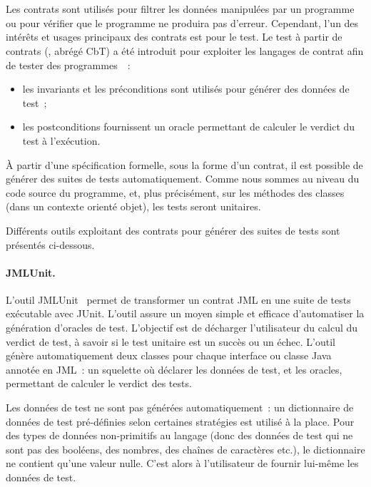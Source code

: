 \section{}
\label{section:sota:cbt}

Les contrats sont utilisés pour {\strong filtrer} les données manipulées par un
programme ou pour vérifier que le programme ne produira pas d'erreur. Cependant,
l'un des intérêts et usages principaux des contrats est pour le test. Le
{\strong test à partir de contrats} (, abrégé
CbT) a été introduit pour exploiter les langages de contrat afin de tester des
programmes~~:
%
\begin{itemize}

\item les invariants et les préconditions sont utilisés pour {\strong générer
des données} de test~;

\item les postconditions {\strong fournissent un oracle} permettant de calculer
le verdict du test à l'exécution.

\end{itemize}
%
À partir d'une spécification formelle, sous la forme d'un contrat, il est
possible de générer des suites de tests automatiquement. Comme nous sommes au
niveau du code source du programme, et, plus précisément, sur les méthodes des
classes (dans un contexte orienté objet), les tests seront {\strong unitaires}.

Différents outils exploitant des contrats pour générer des suites de tests sont
présentés ci-dessous.

\paragraph{JMLUnit.} L'outil JMLUnit~ permet de
transformer un contrat JML en une suite de tests exécutable avec JUnit. L'outil
assure un moyen simple et efficace d'automatiser la génération d'oracles de
test. L'objectif est de décharger l'utilisateur du calcul du verdict de test, à
savoir si le test unitaire est un succès ou un échec. L'outil génère
automatiquement deux classes pour chaque interface ou classe Java annotée en
JML~: un squelette où déclarer les données de test, et les oracles, permettant
de calculer le verdict des tests.

Les données de test ne sont pas générées automatiquement~: un dictionnaire de
données de test pré-définies selon certaines stratégies est utilisé à la place.
Pour des types de données non-primitifs au langage (donc des données de test
qui ne sont pas des booléens, des nombres, des chaînes de caractères etc.), le
dictionnaire ne contient qu'une valeur nulle. C'est alors à l'utilisateur de
fournir lui-même les données de test.

